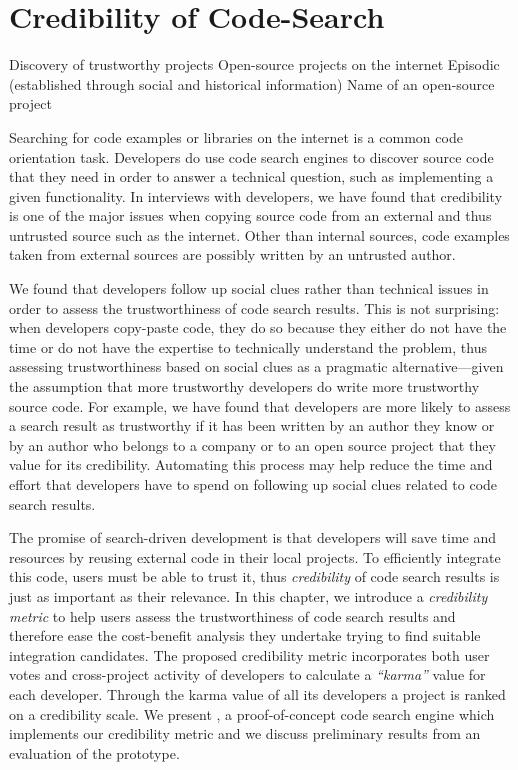 
\chapter{Credibility of Code-Search}
\label{the chapter on codesearch}

\infobox
	{Discovery of trustworthy projects}
	{Open-source projects on the internet}
	{Episodic (established through social and historical information)}
	{Name of an open-source project}

Searching for code examples or libraries on the internet is a common code orientation task. Developers do use code search engines to discover source code that they need in order to answer a technical question, such as implementing a given functionality. In interviews with developers, we have found that credibility is one of the major issues when copying source code from an external and thus untrusted source such as the internet. Other than internal sources, code examples taken from external sources are possibly written by an untrusted author.

We found that developers follow up social clues rather than technical issues in order to assess the trustworthiness of code search results. This is not surprising: when developers copy-paste code, they do so because they either do not have the time or do not have the expertise to technically understand the problem, thus assessing trustworthiness based on social clues as a pragmatic alternative---given the assumption that more trustworthy developers do write more trustworthy source code. For example, we have found that developers are more likely to assess a search result as trustworthy if it has been written by an author they know or by an author who belongs to a company or to an open source project that they value for its credibility. Automating this process may help reduce the time and effort that developers have to spend on following up social clues related to code search results.

\asteriskasteriskasterisk

The promise of search-driven development is that developers will save time and resources by reusing external code in their local projects. To efficiently integrate this code, users must be able to trust it, thus \emph{credibility} of code search results is just as important as their relevance. 
%
In this chapter, we introduce a \emph{credibility metric} to help users assess the trustworthiness of code search results and therefore ease the cost-benefit analysis they undertake trying to find suitable integration candidates. The proposed credibility metric incorporates both user votes and cross-project activity of developers to calculate a \emph{``karma''} value for each developer. Through the karma value of all its developers a project is ranked on a credibility scale.
%
We present \Jbd, a proof-of-concept code search engine which implements our credibility metric and we discuss preliminary results from an evaluation of the prototype.

